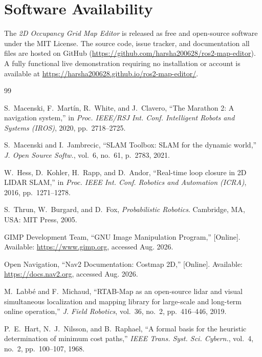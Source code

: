 \documentclass[journal]{IEEEtran}
\begin{document}
\section*{Software Availability}
The \emph{2D Occupancy Grid Map Editor} is released as free and open-source software under the MIT License. The source code, issue tracker, and documentation all files are hosted on GitHub       (\url{https://github.com/harsha200628/ros2-map-editor}). A fully functional live demonstration requiring no installation or account is available at \url{https://harsha200628.github.io/ros2-map-editor/}.

\begin{thebibliography}{99}
\footnotesize
\setlength{\itemsep}{0pt}
\setlength{\parskip}{0pt}

S.~Macenski, F.~Martín, R.~White, and J.~Clavero, ``The Marathon 2: A navigation system,'' in \emph{Proc. IEEE/RSJ Int. Conf. Intelligent Robots and Systems (IROS)}, 2020, pp.\ 2718--2725.

S.~Macenski and I.~Jambrecic, ``SLAM Toolbox: SLAM for the dynamic world,'' \emph{J. Open Source Softw.}, vol.~6, no.~61, p.~2783, 2021.

W.~Hess, D.~Kohler, H.~Rapp, and D.~Andor, ``Real-time loop closure in 2D LIDAR SLAM,'' in \emph{Proc. IEEE Int. Conf. Robotics and Automation (ICRA)}, 2016, pp.\ 1271--1278.

S.~Thrun, W.~Burgard, and D.~Fox, \emph{Probabilistic Robotics}. Cambridge, MA, USA: MIT Press, 2005.

GIMP Development Team, ``GNU Image Manipulation Program,'' [Online]. Available: \url{https://www.gimp.org}, accessed Aug. 2026.

Open Navigation, ``Nav2 Documentation: Costmap 2D,'' [Online]. Available: \url{https://docs.nav2.org}, accessed Aug. 2026.

M.~Labbé and F.~Michaud, ``RTAB-Map as an open-source lidar and visual simultaneous localization and mapping library for large-scale and long-term online operation,'' \emph{J. Field Robotics}, vol.~36, no.~2, pp.\ 416--446, 2019.

P.~E.~Hart, N.~J.~Nilsson, and B.~Raphael, ``A formal basis for the heuristic determination of minimum cost paths,'' \emph{IEEE Trans. Syst. Sci. Cybern.}, vol.~4, no.~2, pp.\ 100--107, 1968.


\end{thebibliography}
\end{document}
